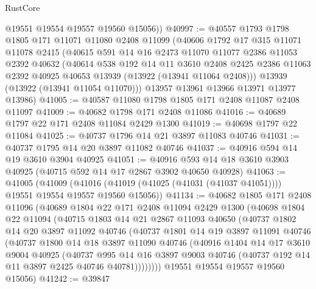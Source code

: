\begin{lexlean}{RustCore}
\begin{coremodule}
        @19551
        @19554
        @19557
        @19560
        @15056))
@40997 := @40557
    @1793
    @1798
    @1805
    @171
    @11071
    @11080
    @2408
    @11099
    (@40606
      @1792
      @17
      @315
      @11071
      @11078
      @2415
      (@40615
        @591
        @14
        @16
        @2473
        @11070
        @11077
        @2386
        @11053
        @2392
        @40632
        (@40614
          @538
          @192
          @14
          @11
          @3610
          @2408
          @2425
          @2386
          @11063
          @2392
          @40925
          @40653
          @13939
          (@13922 (@13941 @11064 @2408)))
        @13939
        (@13922 (@13941 @11054 @11070)))
      @13957
      @13961
      @13966
      @13971
      @13977
      @13986)
@41005 := @40587 @11080 @1798 @1805 @171 @2408 @11087 @2408 @11097
@41009 := @40682 @1798 @171 @2408 @11086
@41016 := @40689 @1797 @22 @171 @2408 @11084 @2429 @1300
@41019 := @40698 @1797 @22 @11084
@41025 := @40737 @1796 @14 @21 @3897 @11083 @40746
@41031 := @40737 @1795 @14 @20 @3897 @11082 @40746
@41037 := @40916 @594 @14 @19 @3610 @3904 @40925
@41051 := @40916 @593 @14 @18 @3610 @3903 @40925 (@40715 @592 @14 @17 @2867 @3902 @40650 @40928)
@41063 := @41005
    (@41009 (@41016 (@41019 (@41025 (@41031 (@41037 @41051)))) @19551 @19554 @19557 @19560 @15056))
@41134 := @40682
    @1805
    @171
    @2408
    @11096
    (@40689
      @1804
      @22
      @171
      @2408
      @11094
      @2429
      @1300
      (@40698
        @1804
        @22
        @11094
        (@40715
          @1803
          @14
          @21
          @2867
          @11093
          @40650
          (@40737
            @1802
            @14
            @20
            @3897
            @11092
            @40746
            (@40737
              @1801
              @14
              @19
              @3897
              @11091
              @40746
              (@40737
                @1800
                @14
                @18
                @3897
                @11090
                @40746
                (@40916
                  @1404
                  @14
                  @17
                  @3610
                  @9004
                  @40925
                  (@40737
                    @995
                    @14
                    @16
                    @3897
                    @9003
                    @40746
                    (@40737 @192 @14 @11 @3897 @2425 @40746 @40781))))))))
      @19551
      @19554
      @19557
      @19560
      @15056)
@41242 := @39847

\end{coremodule}
\end{lexlean}
